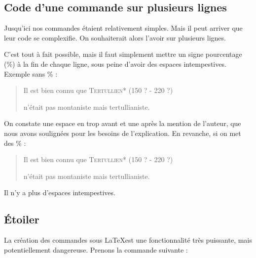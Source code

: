 \subsection{Code d'une commande sur plusieurs lignes}\label{commandepourcent}

Jusqu'ici nos commandes étaient relativement simples. Mais il peut arriver que leur code se complexifie. On souhaiterait alors l'avoir sur plusieurs lignes.

C'est tout à fait possible, mais il faut simplement mettre  un signe pourcentage (\%) à la fin de chaque ligne, sous peine d'avoir  des espaces intempestives. Exemple sans  \% :

\begin{latexcode}
\newcommand{\auteur}[2]{
    \textsc{#1}* (#2)
    }
\end{latexcode}

\renewcommand{\auteur}[2]{\underline{ }%
    \textsc{#1}* (#2)\underline{ }%
}

\begin{quotation}
Il est bien connu que \auteur{Tertullien}{150 ? - 220 ?}
n'était pas montaniste mais tertullianiste.
\end{quotation}

On constate une espace en trop avant et une après la mention de l'auteur, que nous avons soulignées pour les besoins de l'explication.
En revanche, si on met des \% :

\begin{latexcode}
\newcommand{\auteur}[2]{%
    \textsc{#1}* (#2)%
    }
\end{latexcode}

\renewcommand{\auteur}[2]{%
    \textsc{#1}* (#2)%
}

\begin{quotation}
Il est bien connu que \auteur{Tertullien}{150 ? - 220 ?}
n'était pas montaniste mais tertullianiste.
\end{quotation}

Il n'y a plus d'espaces intempestives.


\subsection{Étoiler }

La création des commandes sous \LaTeX est une fonctionnalité très puissante, mais potentiellement dangereuse. Prenons la commande suivante :

\begin{latexcode}
\newcommand{\auteur}[1]{\textsc{#1}*}
\end{latexcode}

